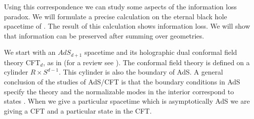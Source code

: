 Using this correspondence we can study some aspects of the information 
loss paradox. 
 We will formulate a precise calculation
on  the eternal black hole spacetime of  \penrose . The
result of this calculation  shows information loss. We will 
show that  information can be  preserved after summing over geometries. 



We  start with an $AdS_{d+1}$ spacetime  and its holographic dual 
conformal field theory CFT$_d$, as in 
(for a review see \review ).
The conformal field theory is defined on a cylinder $R\times S^{d-1}$.
This cylinder is also the boundary of AdS. 
A general conclusion of the studies of AdS/CFT is that the boundary 
conditions in AdS specify the theory and the  normalizable
modes in the interior correspond to  states .
 When we give a 
particular spacetime which is asymptotically AdS we are giving a CFT and
a particular state in the CFT.  

\ifig{}
{}

